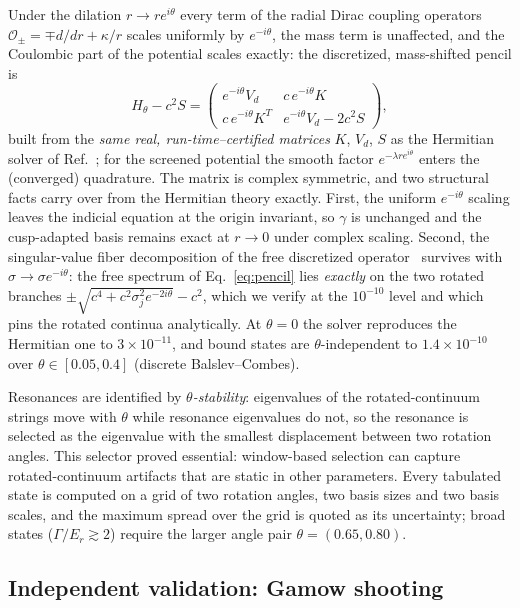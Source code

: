 \documentclass[aps,pra,twocolumn,superscriptaddress,floatfix,longbibliography]{revtex4-2}
\newcommand{\Op}{\ensuremath{\mathcal{O}}}
\begin{document}
Under the dilation $r\to re^{i\theta}$ every term of the radial Dirac
coupling operators $\Op_{\pm}=\mp d/dr+\kappa/r$ scales uniformly by
$e^{-i\theta}$, the mass term is unaffected, and the Coulombic part of
the potential scales exactly: the discretized, mass-shifted pencil is
\begin{equation}
H_{\theta}-c^{2}S=
\begin{pmatrix}
e^{-i\theta}V_{d} & c\,e^{-i\theta}K\\[2pt]
c\,e^{-i\theta}K^{T} & e^{-i\theta}V_{d}-2c^{2}S
\end{pmatrix},
\label{eq:pencil}
\end{equation}
built from the \emph{same real, run-time--certified matrices} $K$,
$V_{d}$, $S$ as the Hermitian solver of Ref.~\cite{companionA}; for the
screened potential the smooth factor $e^{-\lambda re^{i\theta}}$ enters
the (converged) quadrature. The matrix is complex symmetric, and two
structural facts carry over from the Hermitian theory exactly. First,
the uniform $e^{-i\theta}$ scaling leaves the indicial equation at the
origin invariant, so $\gamma$ is unchanged and the cusp-adapted basis
remains exact at $r\to0$ under complex scaling. Second, the
singular-value fiber decomposition of the free discretized
operator~\cite{companionT} survives with $\sigma\to\sigma e^{-i\theta}$:
the free spectrum of Eq.~\eqref{eq:pencil} lies \emph{exactly} on the
two rotated branches $\pm\sqrt{c^{4}+c^{2}\sigma_{j}^{2}
e^{-2i\theta}}-c^{2}$, which we verify at the $10^{-10}$ level and
which pins the rotated continua analytically. At $\theta=0$ the solver
reproduces the Hermitian one to $3\times10^{-11}$, and bound states are
$\theta$-independent to $1.4\times10^{-10}$ over
$\theta\in[0.05,0.4]$ (discrete Balslev--Combes).

Resonances are identified by \emph{$\theta$-stability}: eigenvalues of
the rotated-continuum strings move with $\theta$ while resonance
eigenvalues do not, so the resonance is selected as the eigenvalue with
the smallest displacement between two rotation angles. This selector
proved essential: window-based selection can capture
rotated-continuum artifacts that are static in other parameters. Every
tabulated state is computed on a grid of two rotation angles, two basis
sizes and two basis scales, and the maximum spread over the grid is
quoted as its uncertainty; broad states ($\Gamma/E_{r}\gtrsim2$)
require the larger angle pair $\theta=(0.65,0.80)$.

\subsection{Independent validation: Gamow shooting}
\end{document}
